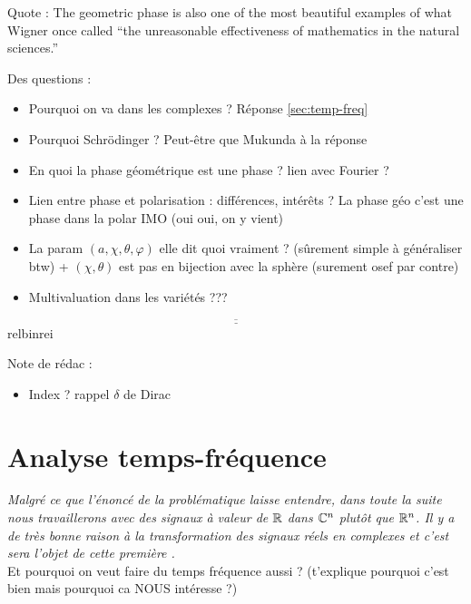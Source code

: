 Quote : The geometric phase is also one of the most beautiful examples of what Wigner once called ``the unreasonable effectiveness of mathematics in the natural sciences.'' \cite[p.\,4]{bohm_geometric_2003}

Des questions :
\begin{itemize}
	
	\item Pourquoi on va dans les complexes ? Réponse \cref{sec:temp-freq}
	
	\item Pourquoi Schrödinger ? Peut-être que Mukunda \cite{mukunda_quantum_1993} à la réponse
	
	\item En quoi la phase géométrique est une phase ? lien avec Fourier ?
	
	\item Lien entre phase et polarisation : différences, intérêts ? La phase géo c'est une phase dans la polar IMO (oui oui, on y vient)
	
	\item La param $(a,\chi,\theta,\varphi)$ elle dit quoi vraiment ? (sûrement simple à généraliser btw) + $(\chi,\theta)$ est pas en bijection avec la sphère (surement osef par contre)
	
	\item Multivaluation dans les variétés \cite[p. 8]{bohm_geometric_2003} ???
	
\end{itemize}

\[\underline{\overline{\qquad\qquad\qquad\qquad\qquad\qquad\qquad\qquad\qquad\qquad\qquad\qquad\qquad\qquad\qquad\qquad\qquad\qquad}}\]{\color{white}relbinrei}

Note de rédac :
\begin{itemize}
	\item Index ? rappel $\delta$ de Dirac
\end{itemize}


\part{Analyse temps-fréquence}

\begin{enonce}
	\textit{Malgré ce que l'énoncé de la problématique laisse entendre, dans toute la suite nous travaillerons avec des signaux à valeur de $\mathbb{R}$ dans $\mathbb{C}^n$ plutôt que $\mathbb{R}^n$. Il y a de très bonne raison à la transformation des signaux réels en complexes et c'est sera l'objet de cette première  .}\\
	
	Et pourquoi on veut faire du temps fréquence aussi ? (t'explique pourquoi c'est bien mais pourquoi ca NOUS intéresse ?)
\end{enonce}



